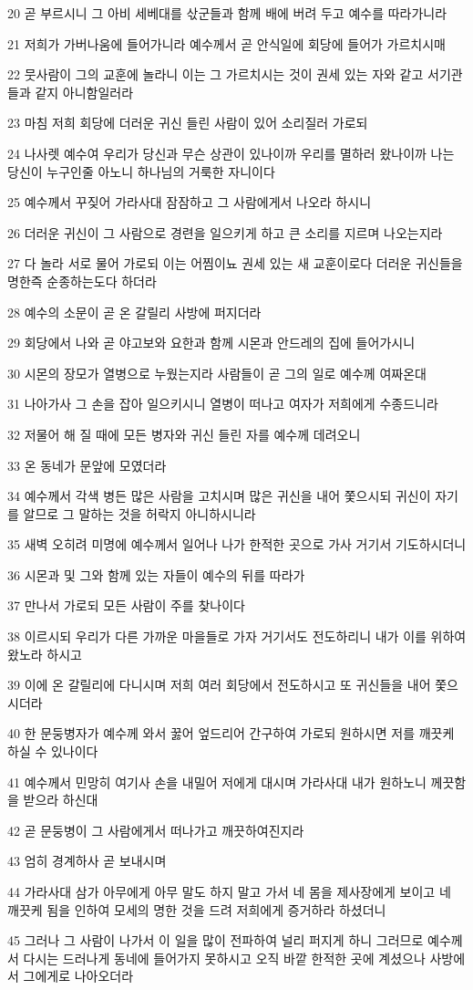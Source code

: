 \par 20 곧 부르시니 그 아비 세베대를 삯군들과 함께 배에 버려 두고 예수를 따라가니라
\par 21 저희가 가버나움에 들어가니라 예수께서 곧 안식일에 회당에 들어가 가르치시매
\par 22 뭇사람이 그의 교훈에 놀라니 이는 그 가르치시는 것이 권세 있는 자와 같고 서기관들과 같지 아니함일러라
\par 23 마침 저희 회당에 더러운 귀신 들린 사람이 있어 소리질러 가로되
\par 24 나사렛 예수여 우리가 당신과 무슨 상관이 있나이까 우리를 멸하러 왔나이까 나는 당신이 누구인줄 아노니 하나님의 거룩한 자니이다
\par 25 예수께서 꾸짖어 가라사대 잠잠하고 그 사람에게서 나오라 하시니
\par 26 더러운 귀신이 그 사람으로 경련을 일으키게 하고 큰 소리를 지르며 나오는지라
\par 27 다 놀라 서로 물어 가로되 이는 어찜이뇨 권세 있는 새 교훈이로다 더러운 귀신들을 명한즉 순종하는도다 하더라
\par 28 예수의 소문이 곧 온 갈릴리 사방에 퍼지더라
\par 29 회당에서 나와 곧 야고보와 요한과 함께 시몬과 안드레의 집에 들어가시니
\par 30 시몬의 장모가 열병으로 누웠는지라 사람들이 곧 그의 일로 예수께 여짜온대
\par 31 나아가사 그 손을 잡아 일으키시니 열병이 떠나고 여자가 저희에게 수종드니라
\par 32 저물어 해 질 때에 모든 병자와 귀신 들린 자를 예수께 데려오니
\par 33 온 동네가 문앞에 모였더라
\par 34 예수께서 각색 병든 많은 사람을 고치시며 많은 귀신을 내어 쫓으시되 귀신이 자기를 알므로 그 말하는 것을 허락지 아니하시니라
\par 35 새벽 오히려 미명에 예수께서 일어나 나가 한적한 곳으로 가사 거기서 기도하시더니
\par 36 시몬과 및 그와 함께 있는 자들이 예수의 뒤를 따라가
\par 37 만나서 가로되 모든 사람이 주를 찾나이다
\par 38 이르시되 우리가 다른 가까운 마을들로 가자 거기서도 전도하리니 내가 이를 위하여 왔노라 하시고
\par 39 이에 온 갈릴리에 다니시며 저희 여러 회당에서 전도하시고 또 귀신들을 내어 쫓으시더라
\par 40 한 문둥병자가 예수께 와서 꿇어 엎드리어 간구하여 가로되 원하시면 저를 깨끗케 하실 수 있나이다
\par 41 예수께서 민망히 여기사 손을 내밀어 저에게 대시며 가라사대 내가 원하노니 께끗함을 받으라 하신대
\par 42 곧 문둥병이 그 사람에게서 떠나가고 깨끗하여진지라
\par 43 엄히 경계하사 곧 보내시며
\par 44 가라사대 삼가 아무에게 아무 말도 하지 말고 가서 네 몸을 제사장에게 보이고 네 깨끗케 됨을 인하여 모세의 명한 것을 드려 저희에게 증거하라 하셨더니
\par 45 그러나 그 사람이 나가서 이 일을 많이 전파하여 널리 퍼지게 하니 그러므로 예수께서 다시는 드러나게 동네에 들어가지 못하시고 오직 바깥 한적한 곳에 계셨으나 사방에서 그에게로 나아오더라


